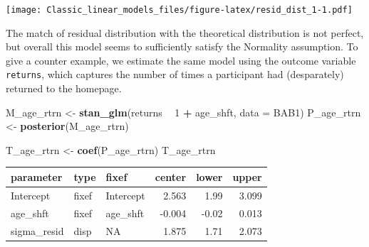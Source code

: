 \documentclass[]{svmono}
\newenvironment{Shaded}{\begin{snugshade}}{\end{snugshade}}
\newcommand{\KeywordTok}[1]{\textcolor[rgb]{0.13,0.29,0.53}{\textbf{#1}}}
\newcommand{\DataTypeTok}[1]{\textcolor[rgb]{0.13,0.29,0.53}{#1}}
\newcommand{\DecValTok}[1]{\textcolor[rgb]{0.00,0.00,0.81}{#1}}
\newcommand{\StringTok}[1]{\textcolor[rgb]{0.31,0.60,0.02}{#1}}
\newcommand{\OperatorTok}[1]{\textcolor[rgb]{0.81,0.36,0.00}{\textbf{#1}}}
\newcommand{\NormalTok}[1]{#1}
\theoremstyle{definition}
\theoremstyle{definition}
\theoremstyle{definition}
\theoremstyle{remark}
\begin{document}
\texttt{[image: Classic\_linear\_models\_files/figure-latex/resid\_dist\_1-1.pdf]}

The match of residual distribution with the theoretical distribution is
not perfect, but overall this model seems to sufficiently satisfy the
Normality assumption. To give a counter example, we estimate the same
model using the outcome variable \texttt{returns}, which captures the
number of times a participant had (desparately) returned to the
homepage.

\begin{Shaded}
\begin{Highlighting}[]
\NormalTok{M_age_rtrn <-}\StringTok{ }
\StringTok{  }\KeywordTok{stan_glm}\NormalTok{(returns }\OperatorTok{~}\StringTok{ }\DecValTok{1} \OperatorTok{+}\StringTok{ }\NormalTok{age_shft, }\DataTypeTok{data =}\NormalTok{ BAB1)}
\NormalTok{P_age_rtrn <-}\StringTok{ }\KeywordTok{posterior}\NormalTok{(M_age_rtrn)}
\end{Highlighting}
\end{Shaded}

\begin{Shaded}
\begin{Highlighting}[]
\NormalTok{T_age_rtrn <-}\StringTok{ }\KeywordTok{coef}\NormalTok{(P_age_rtrn)}
\NormalTok{T_age_rtrn}
\end{Highlighting}
\end{Shaded}

\begin{longtable}[]{@{}lllrrr@{}}
\toprule
parameter & type & fixef & center & lower & upper\tabularnewline
\midrule
\endhead
Intercept & fixef & Intercept & 2.563 & 1.99 & 3.099\tabularnewline
age\_shft & fixef & age\_shft & -0.004 & -0.02 & 0.013\tabularnewline
sigma\_resid & disp & NA & 1.875 & 1.71 & 2.073\tabularnewline
\bottomrule
\end{longtable}
\end{document}
